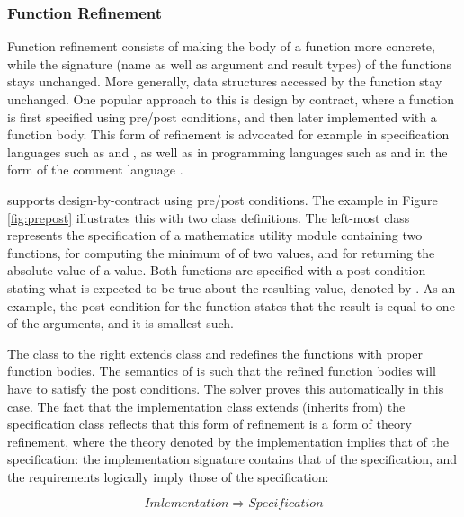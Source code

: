 \subsubsection{Function Refinement}

Function refinement consists of making the body of a function more concrete,
while the signature (name as well as  argument and result types) of the 
functions stays unchanged. More generally, data 
structures accessed by the function stay unchanged. One popular approach to this
is design by contract, where a function is first specified using pre/post 
conditions, and then later implemented with a function body. This form of 
refinement is advocated for example in specification languages such as 
\vdm{} \cite{vdm} and \raiselang{} \cite{raise}, as well as in programming
languages such as \eiffel{} \cite{eiffel} and \java{} in the form of the \jml{}
comment language \cite{jml}. 

\Klang{} supports design-by-contract using pre/post conditions. The example in
Figure \ref{fig:prepost} illustrates this with two class definitions. The left-most
class  represents the specification of a mathematics utility 
module containing two functions,  for computing the minimum of of
two values, and  for returning the absolute value of a value. Both 
functions are specified with a post condition stating what is expected to be true
about the resulting value, denoted by . As an example, the post
condition for the  function states that the result is equal to one of
the arguments, and it is smallest such.

The class 
to the right extends class  and redefines the functions with
proper function bodies. The semantics of \Klang{} is such that the refined function 
bodies will have to satisfy the post conditions. The \Klang{} solver proves this
automatically in this case. The fact that the implementation class extends 
(inherits from) the specification class reflects that this form of refinement is a 
form of theory refinement, where the theory denoted by the implementation implies 
that of the specification: the implementation signature contains that of the 
specification, and the requirements logically imply those of the specification:

\[
Imlementation \Rightarrow Specification
\]

